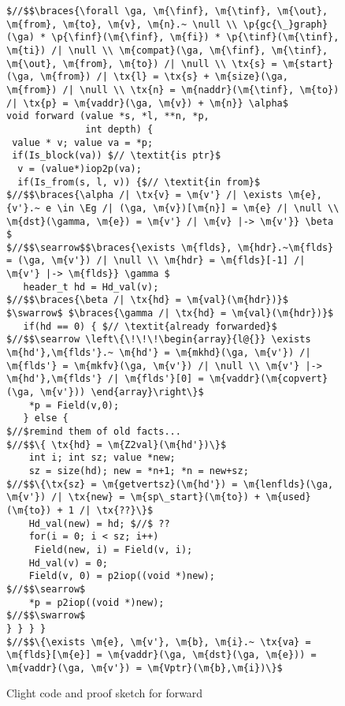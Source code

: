 \newcommand{\finf}{finf}
\newcommand{\tinf}{tinf}
\newcommand{\out}{out}
\newcommand{\braces}[1]{\left\{\!\!\!\begin{array}{l@{}} #1 \end{array}\right\}}
\newcommand{\ga}{\gamma}
\newcommand{\Eg}{E_\ga}
\newcommand{\Vg}{V_\ga}

\begin{figure*}[!ht]
\vspace{-1ex}
  \begin{lstlisting}[multicols=2]
$//$$\braces{\forall \ga, \m{\finf}, \m{\tinf}, \m{\out}, \m{from}, \m{to}, \m{v}, \m{n}.~ \null \\ \p{gc{\_}graph}(\ga) * \p{\finf}(\m{\finf}, \m{fi}) * \p{\tinf}(\m{\tinf}, \m{ti}) /| \null \\ \m{compat}(\ga, \m{\finf}, \m{\tinf}, \m{\out}, \m{from}, \m{to}) /| \null \\ \tx{s} = \m{start}(\ga, \m{from}) /| \tx{l} = \tx{s} + \m{size}(\ga, \m{from}) /| \null \\ \tx{n} = \m{naddr}(\m{\tinf}, \m{to}) /| \tx{p} = \m{vaddr}(\ga, \m{v}) + \m{n}} \alpha$
void forward (value *s, *l, **n, *p, 
              int depth) {
 value * v; value va = *p; 
 if(Is_block(va)) $// \textit{is ptr}$
  v = (value*)iop2p(va); 
  if(Is_from(s, l, v)) {$// \textit{in from}$
$//$$\braces{\alpha /| \tx{v} = \m{v'} /| \exists \m{e}, {v'}.~ e \in \Eg /| (\ga, \m{v})[\m{n}] = \m{e} /| \null \\ \m{dst}(\gamma, \m{e}) = \m{v'} /| \m{v} |-> \m{v'}} \beta $
$//$$\searrow$$\braces{\exists \m{flds}, \m{hdr}.~\m{flds} = (\ga, \m{v'}) /| \null \\ \m{hdr} = \m{flds}[-1] /| \m{v'} |-> \m{flds}} \gamma $
   header_t hd = Hd_val(v);
$//$$\braces{\beta /| \tx{hd} = \m{val}(\m{hdr})}$ $\swarrow$ $\braces{\gamma /| \tx{hd} = \m{val}(\m{hdr})}$
   if(hd == 0) { $// \textit{already forwarded}$
$//$$\searrow \left\{\!\!\!\begin{array}{l@{}} \exists \m{hd'},\m{flds'}.~ \m{hd'} = \m{mkhd}(\ga, \m{v'}) /| \m{flds'} = \m{mkfv}(\ga, \m{v'}) /| \null \\ \m{v'} |-> \m{hd'},\m{flds'} /| \m{flds'}[0] = \m{vaddr}(\m{copvert}(\ga, \m{v'})) \end{array}\right\}$
    *p = Field(v,0);
   } else {
$//$remind them of old facts...
$//$$\{ \tx{hd} = \m{Z2val}(\m{hd'})\}$
    int i; int sz; value *new;
    sz = size(hd); new = *n+1; *n = new+sz;
$//$$\{\tx{sz} = \m{getvertsz}(\m{hd'}) = \m{lenflds}(\ga, \m{v'}) /| \tx{new} = \m{sp\_start}(\m{to}) + \m{used}(\m{to}) + 1 /| \tx{??}\}$        
    Hd_val(new) = hd; $//$ ??
    for(i = 0; i < sz; i++) 
     Field(new, i) = Field(v, i);
    Hd_val(v) = 0;
    Field(v, 0) = p2iop((void *)new);
$//$$\searrow$
    *p = p2iop((void *)new);
$//$$\swarrow$
} } } }
$//$$\{\exists \m{e}, \m{v'}, \m{b}, \m{i}.~ \tx{va} = \m{flds}[\m{e}] = \m{vaddr}(\ga, \m{dst}(\ga, \m{e})) = \m{vaddr}(\ga, \m{v'}) = \m{Vptr}(\m{b},\m{i})\}$

\end{lstlisting}
\vspace{-0.4em}
\caption{Clight code and proof sketch for forward}
\label{fig:forward}
\vspace{-1em}
\end{figure*}

